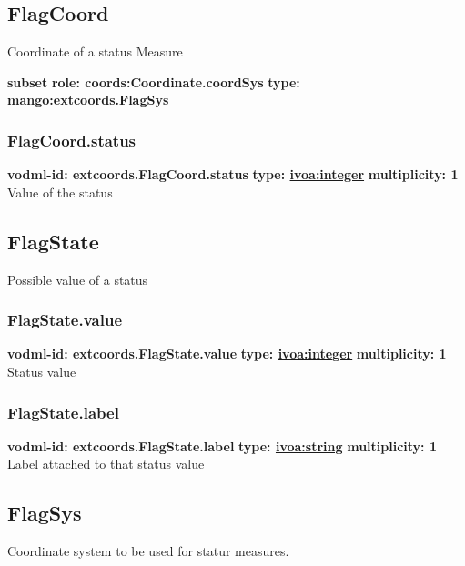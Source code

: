   \subsection{FlagCoord}
  \label{sect:extcoords.FlagCoord}
    Coordinate of a status Measure

    \noindent \textbf{subset} \newline
    \indent   \textbf{role: coords:Coordinate.coordSys} \newline
    \indent   \textbf{type:  mango:extcoords.FlagSys} \newline


    \subsubsection{FlagCoord.status}
      \textbf{vodml-id: extcoords.FlagCoord.status} \newline
      \textbf{type: \hyperref[sect:ivoa]{ivoa:integer}} \newline
      \textbf{multiplicity: 1} \newline 
      Value of the status

  \subsection{FlagState}
  \label{sect:extcoords.FlagState}
    Possible value of a status

    \subsubsection{FlagState.value}
      \textbf{vodml-id: extcoords.FlagState.value} \newline
      \textbf{type: \hyperref[sect:ivoa]{ivoa:integer}} \newline
      \textbf{multiplicity: 1} \newline 
      Status value

    \subsubsection{FlagState.label}
      \textbf{vodml-id: extcoords.FlagState.label} \newline
      \textbf{type: \hyperref[sect:ivoa]{ivoa:string}} \newline
      \textbf{multiplicity: 1} \newline 
      Label attached to that status value

  \subsection{FlagSys}
  \label{sect:extcoords.FlagSys}
    Coordinate system to be used for statur measures.

